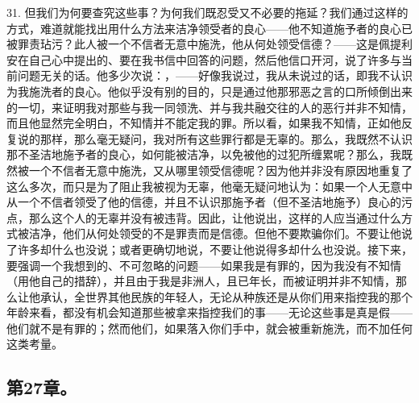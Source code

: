 31. 但我们为何要查究这些事？为何我们既忍受又不必要的拖延？我们通过这样的方式，难道就能找出用什么方法来洁净领受者的良心——他不知道施予者的良心已被罪责玷污？此人被一个不信者无意中施洗，他从何处领受信德？——这是佩提利安在自己心中提出的、要在我书信中回答的问题，然后他信口开河，说了许多与当前问题无关的话。他多少次说：，——好像我说过，我从未说过的话，即我不认识为我施洗者的良心。他似乎没有别的目的，只是通过他那邪恶之言的口所倾倒出来的一切，来证明我对那些与我一同领洗、并与我共融交往的人的恶行并非不知情，而且他显然完全明白，不知情并不能定我的罪。所以看，如果我不知情，正如他反复说的那样，那么毫无疑问，我对所有这些罪行都是无辜的。那么，我既然不认识那不圣洁地施予者的良心，如何能被洁净，以免被他的过犯所缠累呢？那么，我既然被一个不信者无意中施洗，又从哪里领受信德呢？因为他并非没有原因地重复了这么多次，而只是为了阻止我被视为无辜，他毫无疑问地认为：如果一个人无意中从一个不信者领受了他的信德，并且不认识那施予者（但不圣洁地施予）良心的污点，那么这个人的无辜并没有被违背。因此，让他说出，这样的人应当通过什么方式被洁净，他们从何处领受的不是罪责而是信德。但他不要欺骗你们。不要让他说了许多却什么也没说；或者更确切地说，不要让他说得多却什么也没说。接下来，要强调一个我想到的、不可忽略的问题——如果我是有罪的，因为我没有不知情（用他自己的措辞），并且由于我是非洲人，且已年长，而被证明并非不知情，那么让他承认，全世界其他民族的年轻人，无论从种族还是从你们用来指控我的那个年龄来看，都没有机会知道那些被拿来指控我们的事——无论这些事是真是假——他们就不是有罪的；然而他们，如果落入你们手中，就会被重新施洗，而不加任何这类考量。\par


\subsection{第27章。}

